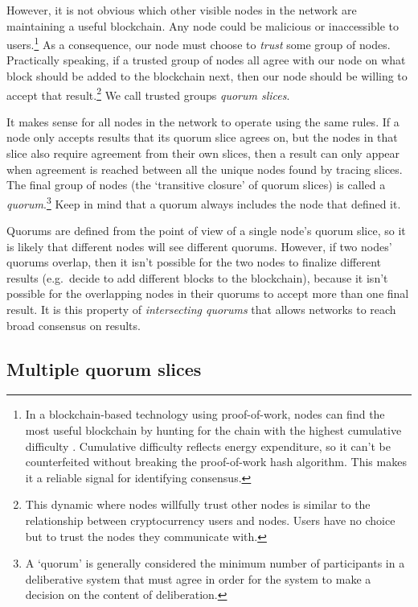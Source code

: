 However, it is not obvious which other visible nodes in the network are maintaining a useful blockchain. Any node could be malicious or inaccessible to users.\footnote{In a blockchain-based technology using proof-of-work, nodes can find the most useful blockchain by hunting for the chain with the highest cumulative difficulty \cite{Nakamoto_bitcoin}. Cumulative difficulty reflects energy expenditure, so it can't be counterfeited without breaking the proof-of-work hash algorithm. This makes it a reliable signal for identifying consensus.} As a consequence, our node must choose to {\em trust} some group of nodes. Practically speaking, if a trusted group of nodes all agree with our node on what block should be added to the blockchain next, then our node should be willing to accept that result.\footnote{This dynamic where nodes willfully trust other nodes is similar to the relationship between cryptocurrency users and nodes. Users have no choice but to trust the nodes they communicate with.} We call trusted groups {\em quorum slices}.

It makes sense for all nodes in the network to operate using the same rules. If a node only accepts results that its quorum slice agrees on, but the nodes in that slice also require agreement from their own slices, then a result can only appear when agreement is reached between all the unique nodes found by tracing slices. The final group of nodes (the `transitive closure' of quorum slices) is called a {\em quorum}.\footnote{A `quorum' is generally considered the minimum number of participants in a deliberative system that must agree in order for the system to make a decision on the content of deliberation.} Keep in mind that a quorum always includes the node that defined it.

Quorums are defined from the point of view of a single node's quorum slice, so it is likely that different nodes will see different quorums. However, if two nodes' quorums overlap, then it isn't possible for the two nodes to finalize different results (e.g.\ decide to add different blocks to the blockchain), because it isn't possible for the overlapping nodes in their quorums to accept more than one final result. It is this property of {\em intersecting quorums} that allows networks to reach broad consensus on results.


\subsection{Multiple quorum slices}
\label{subsec:consensus-multiple-quorum-slices}


